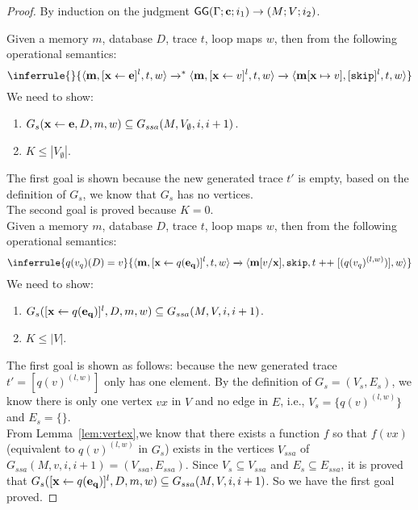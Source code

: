 \begin{proof}
 By induction on the judgment $ \mathsf{GG}{(\Gamma; {\bf{{c}}}; i_1 )}\to {(M; V;i_2)}$.
\\ 

Given a memory $m$, database $D$, trace $t$, loop maps $w$, then from the following operational semantics:
\[\inferrule
{
}
{\config{\ssa{m}, [\assign{\ssa{x}}{\ssa{e}}]^{l},  t,w} \xrightarrow{}^{*}
\config{\ssa{m}, [\assign{\ssa{x}}{ v}]^{l},  t,w} \xrightarrow{} \config{\ssa{m[x} \mapsto v], [\eskip]^{l}, t,w}
}\]
We need to show:
\begin{enumerate}
    \item $ G_{s}(\mathrel{ {\bf{{x}}} \leftarrow {\bf{{e}}} },D,m,w) \subseteq G_{ssa}(M, V_{\emptyset},i, i+1)$.
    \item $K \leq |V_{\emptyset}| $.
\end{enumerate}
The first goal is shown because the new generated trace $t'$ is empty, based on the definition of $G_{s}$, we know that $G_{s}$ has no vertices. \\
The second goal is proved because $K =0$.\\


Given a memory $m$, database $D$, trace $t$, loop maps $w$, then from the following operational semantics:
\[
\inferrule
{
q(v_q)(D) = v 
}
{
\config{\ssa{m}, [\assign{\ssa{x}}{q\ssa{(\expr_q)}}]^l, t, w} \xrightarrow{} \config{\ssa{m}[ v/ \ssa{x}], \eskip,  t \mathrel{++} [(q(v_q)^{(l,w )})],w }
}
\]
We need to show:
\begin{enumerate}
    \item $ G_{s}([\mathrel{ {\bf{{x}}} \leftarrow q{\bf{{(e_q)}}}  }]^{l},D,m,w) \subseteq G_{ssa}(M, V,i, i+1)$.
    \item $K \leq |V| $.
\end{enumerate}
The first goal is shown as follows: because the new generated trace $t'= [q(v)^{(l,w)}]$ only has one element. By the definition of $G_{s} = (V_s,E_s)$, we know there is only one vertex $vx$ in $V$ and no edge in $E$, 
i.e., $V_s = \{q(v)^{(l,w)} \}$ and $E_s = \{\}$.
\\
From Lemma~\ref{lem:vertex},we know that there exists a function $f$ so that $f(vx)$ (equivalent to $q(v)^{(l,w)}$ in $G_s$) exists in the vertices $V_{ssa}$ of $G_{ssa}(M,v,i,i+1) = (V_{ssa}, E_{ssa})$.
Since $V_s \subseteq V_{ssa}$ and $E_s \subseteq E_{ssa}$,
it is proved that $ G_{s}([\mathrel{ {\bf{{x}}} \leftarrow q{\bf{{(e_q)}}}  }]^{l},D,m,w) \subseteq G_{ssa}(M, V,i, i+1)$. So we have the first goal proved.


\end{proof}
